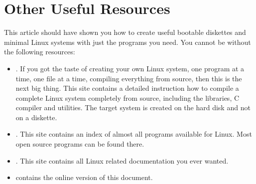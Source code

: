 \documentclass[12pt,a4paper]{article}
\begin{document}
\section{Other Useful Resources}

This article should have shown you how to create useful bootable
diskettes and minimal Linux systems with just the programs you
need. You cannot be without the following resources:
\begin{itemize}
\item {}. 
  If you
  got the taste of creating your own Linux system, one program at a
  time, one file at a time, compiling everything from source, then this
  is the next big thing. This site contains a detailed instruction how
  to compile a complete Linux system completely from source, including
  the libraries, C compiler and utilities. The target system is created on
  the hard disk and not on a diskette. 
\item {}.  This site
  contains an index of almost all programs available for Linux. Most
  open source programs can be found there.
\item {}. 
  This site contains all Linux related documentation you ever wanted.
\item {} contains the online
  version of this document.
\end{itemize}
\end{document}

